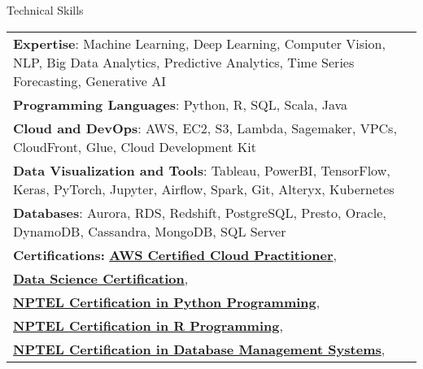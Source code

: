 \documentclass{resume} %
\begin{document}
    \begin{rSection}{Technical Skills}
        \begin{tabular}{ @{} l @{\hspace{1ex}} l }
                                \textbf{Expertise}: Machine Learning, Deep Learning, Computer Vision, NLP, Big Data Analytics, Predictive Analytics, Time Series Forecasting, Generative AI\\
                                \textbf{Programming Languages}: Python, R, SQL, Scala, Java\\
                                \textbf{Cloud and DevOps}: AWS, EC2, S3, Lambda, Sagemaker, VPCs, CloudFront, Glue, Cloud Development Kit\\
                                \textbf{Data Visualization and Tools}: Tableau, PowerBI, TensorFlow, Keras, PyTorch, Jupyter, Airflow, Spark, Git, Alteryx, Kubernetes\\
                                \textbf{Databases}: Aurora, RDS, Redshift, PostgreSQL, Presto, Oracle, DynamoDB, Cassandra, MongoDB, SQL Server\\
                        \textbf{Certifications:} 
                                            \href{None}{\textbf{AWS Certified Cloud Practitioner}},\\
                                            \href{None}{\textbf{Data Science Certification}},\\
                                            \href{None}{\textbf{NPTEL Certification in Python Programming}},\\
                                            \href{None}{\textbf{NPTEL Certification in R Programming}},\\
                                            \href{None}{\textbf{NPTEL Certification in Database Management Systems}},\\
                                 
        \end{tabular}
    \end{rSection}
 

\end{document}
